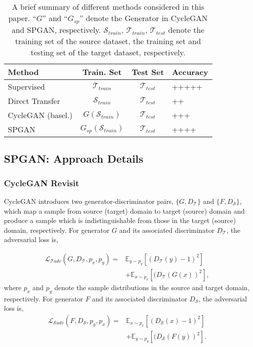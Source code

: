 \documentclass[10pt,twocolumn,letterpaper]{article}
\begin{document}
\setlength{\tabcolsep}{4.6pt}
\begin{table}
\begin{center}
\begin{tabular}{l|ccl}
\hline
Method&Train. Set&Test Set&Accuracy\\
\hline
\hline
Supervised   & $\mathcal{T}_{train}$ & $\mathcal{T}_{test}$  & +++++\\
Direct Transfer   &  $\mathcal{S}_{train} $ & $\mathcal{T}_{test}$  & ++ \\
CycleGAN (basel.)   & $G(\mathcal{S}_{train}) $ & $\mathcal{T}_{test}$   & +++\\
SPGAN   &  $G_{sp}(\mathcal{S}_{train})$ & $\mathcal{T}_{test}$   & ++++\\
\hline
\end{tabular}
\end{center}
\setlength{\abovecaptionskip}{0cm}
\caption{A brief summary of different methods considered in this paper. ``$G$'' and ``$G_{sp}$'' denote the Generator in CycleGAN and SPGAN, respectively. $\mathcal{S}_{train}$, $\mathcal{T}_{train}$,  $\mathcal{T}_{test}$ denote the training set of the source dataset, the training set and testing set of the target dataset, respectively.}
\label{table:summary}
\end{table}
\subsection{SPGAN: Approach Details}\label{SPGAN}
\subsubsection{CycleGAN Revisit}
CycleGAN introduces two generator-discriminator pairs, $\{G, D_{\mathcal{T}}\}$ and $\{F, D_{\mathcal{S}}\}$, which map a sample from source (target) domain to target (source) domain and produce a sample which is indistinguishable from those in the target (source) domain, respectively.
For generator $G$ and its associated discriminator $D_{\mathcal{T}}$, the adversarial loss is,

 \begin{equation}
\begin{split}
\mathcal{L}_{\mathcal{T}adv}(G, D_{\mathcal{T}}, p_{x} , p_{y}) = &\mathbb{E}_{y \sim p_{y}}[(D_{\mathcal{T}}(y)-1)^{2}]\\
&+ \mathbb{E}_{x \sim p_{x}}[(D_{\mathcal{T}}(G(x))^{2}],
\end{split}
\label{Sadv}
\end{equation}where $ p_{x}$ and $ p_{y}$ denote the sample distributions in the source and target domain, respectively. For generator $F$ and its associated discriminator $D_{\mathcal{S}}$, the adversarial loss is, 
 \begin{equation}
\begin{split}
\mathcal{L}_{\mathcal{S}adv}(F, D_{\mathcal{S}}, p_{y} , p_{x}) = &\mathbb{E}_{x \sim p_{x}}[(D_{\mathcal{S}}(x)-1)^{2}]\\
&+ \mathbb{E}_{y \sim p_{y}}[(D_{\mathcal{S}}(F(y))^{2}].
\end{split}
\label{Tadv}
\end{equation} 
\end{document}
